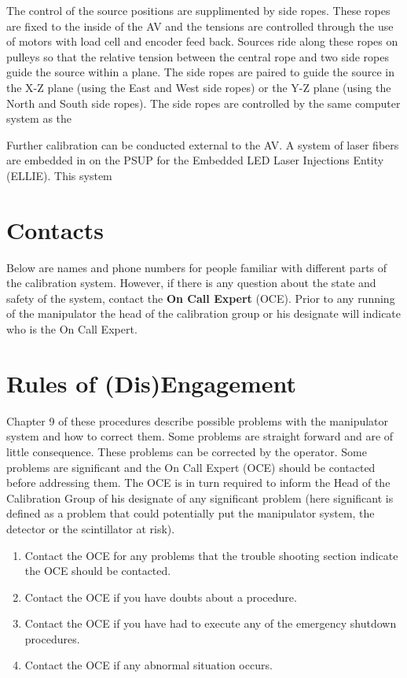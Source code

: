 The control of the source positions are supplimented by side
ropes. These ropes are fixed to the inside of the AV and the tensions
are controlled through the use of motors with load cell and encoder
feed back. Sources ride along these ropes on pulleys so that the
relative tension between the central rope and two side ropes guide the
source within a plane. The side ropes are paired to guide the source
in the X-Z plane (using the East and West side ropes) or the Y-Z plane
(using the North and South side ropes). The side ropes are controlled
by the same computer system as the 

Further calibration can be conducted external to the AV. A system of
laser fibers are embedded in on the PSUP for the Embedded LED Laser
Injections Entity (ELLIE). This system 

\section{Contacts}

Below are names and phone numbers for people familiar with different
parts of the calibration system. However, if there is any question
about the state and safety of the system, contact the \textbf{On Call
  Expert} (OCE). Prior to any running of the manipulator the head of
the calibration group or his designate will indicate who is the On
Call Expert.

\section{Rules of (Dis)Engagement}

Chapter 9 of these procedures describe possible problems with the
manipulator system and how to correct them. Some problems are straight
forward and are of little consequence. These problems can be corrected
by the operator. Some problems are significant and the On Call Expert
(OCE) should be contacted before addressing them. The OCE is in turn
required to inform the Head of the Calibration Group of his designate
of any significant problem (here significant is defined as a problem
that could potentially put the manipulator system, the detector or the
scintillator at risk).

{\bf
  \begin{enumerate}
  \item Contact the OCE for any problems that the trouble shooting
    section indicate the OCE should be contacted.
  \item Contact the OCE if you have doubts about a procedure.
  \item Contact the OCE if you have had to execute any of the
    emergency shutdown procedures.
  \item Contact the OCE if any abnormal situation occurs.
  \end{enumerate}


}

